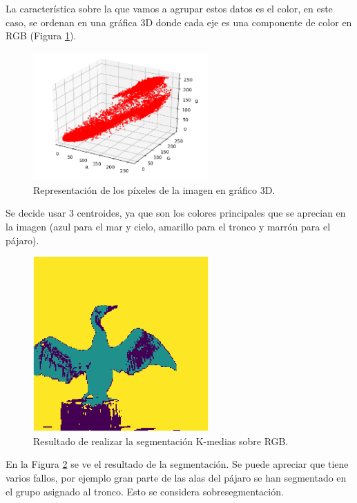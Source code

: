 La característica sobre la que vamos a agrupar estos datos es el color, en este caso, se ordenan en una gráfica 3D donde cada eje es una componente de color en RGB (Figura \ref{cormoranrgb}).\\

\begin{figure}[h]
\centering
\includegraphics[width=0.6\textwidth]{imagenes/cormoranrgb}
\caption{Representación de los píxeles de la imagen en gráfico 3D.}
\label{cormoranrgb}
\end{figure}

 Se decide usar 3 centroides, ya que son los colores principales que se aprecian en la imagen (azul para el mar y cielo, amarillo para el tronco y marrón para el pájaro).\\

\begin{figure}[h]
\centering
\includegraphics[width=0.6\textwidth]{imagenes/segmentacionrgb}
\caption{Resultado de realizar la segmentación K-medias sobre RGB.}
\label{segmentacionrgb}
\end{figure}

En la Figura \ref{segmentacionrgb} se ve el resultado de la segmentación. Se puede apreciar que tiene varios fallos, por ejemplo gran parte de las alas del pájaro se han segmentado en el grupo asignado al tronco. Esto se considera sobresegmentación.\\

